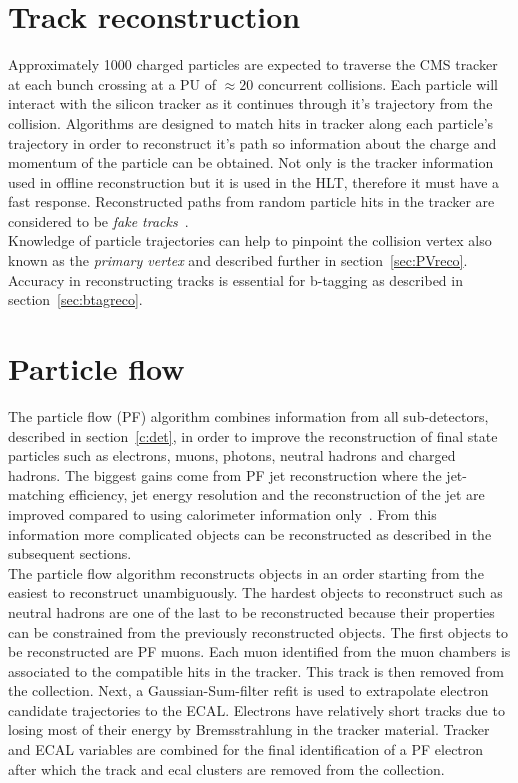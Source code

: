 
\section{Track reconstruction}

Approximately 1000 charged particles are expected to traverse the CMS tracker at each bunch crossing at a PU of $\approx 20$ concurrent collisions. Each particle will interact with the silicon tracker as it continues through it's trajectory from the collision. Algorithms are designed to match hits in tracker along each particle's trajectory in order to reconstruct it's path so information about the charge and momentum of the particle can be obtained. Not only is the tracker information used in offline reconstruction but it is used in the HLT, therefore it must have a fast response. Reconstructed paths from random particle hits in the tracker are considered to be \emph{fake tracks}~\cite{1748-0221-9-10-P10009}.\\
Knowledge of particle trajectories can help to pinpoint the collision vertex also known as the \emph{primary vertex} and described further in section~\ref{sec:PVreco}. Accuracy in reconstructing tracks is essential for b-tagging as described in section~\ref{sec:btagreco}.

\section{Particle flow ~\label{sec:PF}}

The particle flow (PF) algorithm combines information from all sub-detectors, described in section~\ref{c:det}, in order to improve the reconstruction of final state particles such as electrons, muons, photons, neutral hadrons and charged hadrons. The biggest gains come from PF jet reconstruction where the jet-matching efficiency, jet energy resolution and the reconstruction of the jet \pt are improved compared to using calorimeter information only~\cite{CMS-PAS-PFT-10-001}. From this information more complicated objects can be reconstructed as described in the subsequent sections.\\

The particle flow algorithm reconstructs objects in an order starting from the easiest to reconstruct unambiguously. The hardest objects to reconstruct such as neutral hadrons are one of the last to be reconstructed because their properties can be constrained from the previously reconstructed objects.
The first objects to be reconstructed are PF muons. Each muon identified from the muon chambers is associated to the compatible hits in the tracker. This track is then removed from the collection. Next, a Gaussian-Sum-filter refit is used to extrapolate electron candidate trajectories to the ECAL. Electrons have relatively short tracks due to losing most of their energy by Bremsstrahlung in the tracker material. Tracker and ECAL variables are combined for the final identification of a PF electron after which the track and ecal clusters are removed from the collection.

